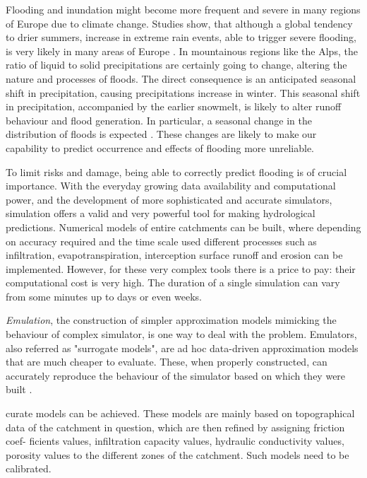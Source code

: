 Flooding and inundation might become more frequent and severe in many regions of Europe due to climate change.
Studies show, that although a global tendency to drier summers, increase in extreme rain events, able to trigger severe flooding, is very likely in many areas of Europe \autocite{christensen_severe_2002}.
In mountainous regions like the Alps, the ratio of liquid to solid precipitations are certainly going to change, altering the nature and processes of floods.
The direct consequence is an anticipated seasonal shift in precipitation, causing precipitations increase in winter. 
This seasonal shift in precipitation, accompanied by the earlier snowmelt, is likely to alter runoff behaviour and flood generation.
In particular, a seasonal change in the distribution of floods is expected \autocite{koplin_seasonality_2014}.
These changes are likely to make our capability to predict occurrence and effects of flooding more unreliable.

To limit risks and damage, being able to correctly predict flooding is of crucial importance.
With the everyday growing data availability and computational power, and the development of more sophisticated and accurate simulators, simulation offers a valid and very powerful tool for making hydrological predictions.
Numerical models of entire catchments can be built, where depending on accuracy required and the time scale used different processes such as infiltration, evapotranspiration, interception surface runoff and erosion can be implemented.
However, for these very complex tools there is a price to pay: their computational cost is very high.
The duration of a single simulation can vary from some minutes up to days or even weeks.

\emph{Emulation}, the construction of simpler approximation models mimicking the behaviour of complex simulator, is one way to deal with the problem.
{Emulators}, also referred as "surrogate models", are ad hoc data-driven approximation models that are much cheaper to evaluate.
These, when properly constructed, can accurately reproduce the behaviour of the simulator based on which they were built \autocite{gorissen_surrogate_2010}.



curate models can be achieved. These models are mainly based on topographical
data of the catchment in question, which are then refined by assigning friction coef-
ficients values, infiltration capacity values, hydraulic conductivity values, porosity
values to the different zones of the catchment. Such models need to be calibrated.





